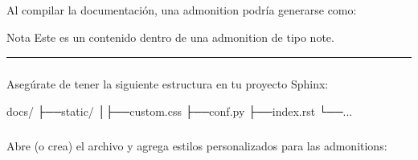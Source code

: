 \documentclass[a4paper,10pt,oneside,spanish,openany]{sphinxmanual}
\begin{document}
\subparagraph{}
\label{\detokenize{configuracion_inicial/013.guia_de_myst_parser:estructura-html-generada-por-una-admonition}}
\sphinxAtStartPar
Al compilar la documentación, una admonition podría generarse como:

\begin{sphinxVerbatim}[commandchars=\\\{\}]
 
   Nota
  Este es un contenido dentro de una admonition de tipo \PYGZdq{}note\PYGZdq{}.
\end{sphinxVerbatim}


\bigskip\hrule\bigskip



\paragraph{}
\label{\detokenize{configuracion_inicial/013.guia_de_myst_parser:crear-un-archivo-de-estilos-personalizado-en-sphinx}}

\subparagraph{}
\label{\detokenize{configuracion_inicial/013.guia_de_myst_parser:estructura-del-proyecto}}
\sphinxAtStartPar
Asegúrate de tener la siguiente estructura en tu proyecto Sphinx:

\begin{sphinxVerbatim}[commandchars=\\\{\}]
docs/
├──\PYGZus{}static/
│├──custom.css
├──conf.py
├──index.rst
└──...
\end{sphinxVerbatim}


\subparagraph{}
\label{\detokenize{configuracion_inicial/013.guia_de_myst_parser:editar-el-archivo-custom-css}}
\sphinxAtStartPar
Abre (o crea) el archivo  y agrega estilos personalizados para las admonitions:
\end{document}
